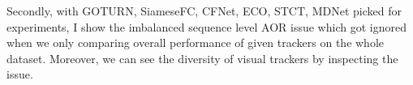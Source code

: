 \documentclass{article}
\begin{document}
Secondly, with GOTURN\cite{goturn}, SiameseFC\cite{siamesefc}, CFNet\cite{cfnet}, ECO\cite{eco}, STCT\cite{stct}, MDNet\cite{mdnet} picked
for experiments, I show the imbalanced sequence level AOR issue which got ignored when we only comparing overall performance of given trackers on the whole dataset. Moreover, we can see the diversity of visual trackers by inspecting the issue.


\begin{table} [htbp]%
  \caption{Partial Result of Descendingly Ranked Sequence Level Average Overlap Ratio of Selected Trackers on OTB.}
    \resizebox{\textwidth}{!}{
    \begin{tabular}{cccccccccccc}
    \toprule
    GOTURN&AOR&SiameseFC&AOR&CFNet&AOR&ECO&AOR&STCT&AOR&MDNet&AOR\\
    \midrule

\end{tabular}}
\end{table}
\end{document}
